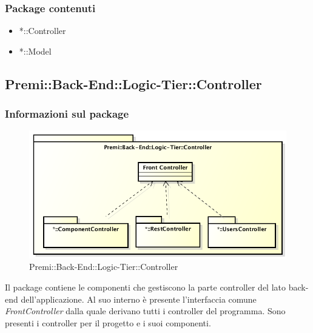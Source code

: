 	\subsubsection{Package contenuti}
	\begin{itemize}
		\item *::Controller
		\item *::Model
	\end{itemize}
	
	
\subsection{Premi::Back-End::Logic-Tier::Controller}
	\subsubsection{Informazioni sul package}
	\begin{figure}[h]
		\centering
		\includegraphics[width=0.7\linewidth]{img/back-end-package_controller}
		\caption[Premi::Back-End::Logic-Tier::Controller]{Premi::Back-End::Logic-Tier::Controller}
	\end{figure}
	Il package contiene le componenti che gestiscono la parte controller del lato back-end dell'applicazione. Al suo interno è presente l'interfaccia comune \textit{FrontController} dalla quale derivano tutti i controller del programma.
	Sono presenti i controller per il progetto e i suoi componenti.


